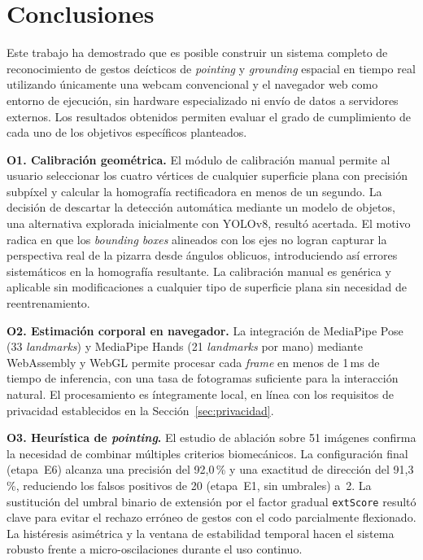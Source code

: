 \documentclass[12pt]{report} %
\begin{document}
\section{Conclusiones}
\label{sec:conclusiones}

Este trabajo ha demostrado que es posible construir un sistema completo de reconocimiento de gestos deícticos de \textit{pointing} y \textit{grounding} espacial en tiempo real utilizando únicamente una webcam convencional y el navegador web como entorno de ejecución, sin hardware especializado ni envío de datos a servidores externos. Los resultados obtenidos permiten evaluar el grado de cumplimiento de cada uno de los objetivos específicos planteados.

\textbf{O1. Calibración geométrica.} El módulo de calibración manual permite al usuario seleccionar los cuatro vértices de cualquier superficie plana con precisión subpíxel y calcular la homografía rectificadora en menos de un segundo. La decisión de descartar la detección automática mediante un modelo de objetos, una alternativa explorada inicialmente con YOLOv8, resultó acertada. El motivo radica en que los \textit{bounding boxes} alineados con los ejes no logran capturar la perspectiva real de la pizarra desde ángulos oblicuos, introduciendo así errores sistemáticos en la homografía resultante. La calibración manual es genérica y aplicable sin modificaciones a cualquier tipo de superficie plana sin necesidad de reentrenamiento.

\textbf{O2. Estimación corporal en navegador.} La integración de MediaPipe Pose (33 \textit{landmarks}) y MediaPipe Hands (21 \textit{landmarks} por mano) mediante WebAssembly y WebGL permite procesar cada \textit{frame} en menos de 1\,ms de tiempo de inferencia, con una tasa de fotogramas suficiente para la interacción natural. El procesamiento es íntegramente local, en línea con los requisitos de privacidad establecidos en la Sección~\ref{sec:privacidad}.

\textbf{O3. Heurística de \textit{pointing}.} El estudio de ablación sobre 51 imágenes confirma la necesidad de combinar múltiples criterios biomecánicos. La configuración final (etapa~E6) alcanza una precisión del 92{,}0\,\% y una exactitud de dirección del 91{,}3\,\%, reduciendo los falsos positivos de 20 (etapa~E1, sin umbrales) a~2. La sustitución del umbral binario de extensión por el factor gradual \texttt{extScore} resultó clave para evitar el rechazo erróneo de gestos con el codo parcialmente flexionado. La histéresis asimétrica y la ventana de estabilidad temporal hacen el sistema robusto frente a micro-oscilaciones durante el uso continuo.
\end{document}

